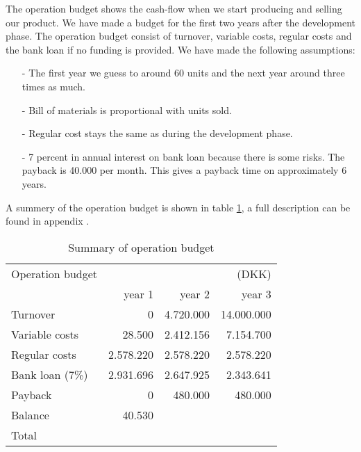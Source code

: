 The operation budget shows the cash-flow when we start producing and selling our product. We have made a budget for the first two years after the development phase. The operation budget consist of turnover, variable costs, regular costs and the bank loan if no funding is provided. We have made the following assumptions:
\begin{itemize}
\item[-] The first year we guess to around 60 units and the next year around three times as much.
\item[-] Bill of materials is proportional with units sold.
\item[-] Regular cost stays the same as during the development phase.
\item[-] 7 percent in annual interest on bank loan because there is some risks. The payback is 40.000 per month. This gives a payback time on approximately 6 years.
\end{itemize}
A summery of the operation budget is shown in table \ref{opebud}, a full description can be found in appendix .
\begin{table}[h!]
\centering
\begin{tabular}{l r r r}
Operation budget      &           &           & (DKK)      \\
                      & year 1    & year 2    & year 3     \\
\hline                
Turnover              &         0 & 4.720.000 & 14.000.000 \\
Variable costs        &    28.500 & 2.412.156 &  7.154.700 \\
Regular costs         & 2.578.220 & 2.578.220 &  2.578.220 \\
Bank loan (7\%)       & 2.931.696 & 2.647.925 &  2.343.641 \\
Payback               &         0 &   480.000 &    480.000 \\
Balance               &    40.530 &           &            \\  
\hline                                                      
Total                 &           &           &            \\
\end{tabular}
\caption{Summary of operation budget}
\label{opebud}
\end{table}
